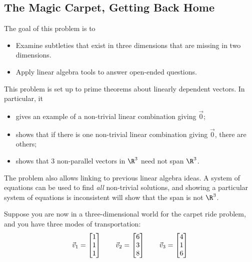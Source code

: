 \begin{iola}
\section*{The Magic Carpet, Getting Back Home}
\question
	\begin{annotation}
		\begin{goals}

			The goal of this problem is to
			\begin{itemize}
				\item Examine subtleties that exist in three dimensions that are
					missing in two dimensions.
				\item Apply linear algebra tools to answer open-ended questions.
			\end{itemize}
		\end{goals}

		\begin{notes}
			This problem is set up to prime
			theorems about linearly dependent vectors. In particular, it
			\begin{itemize}
				\item gives an example of a non-trivial linear combination giving $\vec 0$;
				\item shows that if there is one non-trivial linear combination giving $\vec 0$,
					there are others;
				\item shows that 3 non-parallel vectors in $\R^3$ need not span $\R^3$.
			\end{itemize}

			The problem also allows linking to previous linear algebra ideas. A system
			of equations can be used to find \emph{all} non-trivial solutions, and showing
			a particular system of equations is inconsistent will show that the span
			is not $\R^3$.
		\end{notes}
	\end{annotation}
Suppose you are now in a three-dimensional world for the carpet
ride problem, and you have three modes of transportation:
\[
	\vec v_1 = \mat{1 \\1 \\ 1}\qquad
	\vec v_2 = \mat{6 \\3 \\ 8}\qquad
	\vec v_3 = \mat{4 \\1 \\ 6}
\]


\end{iola}
